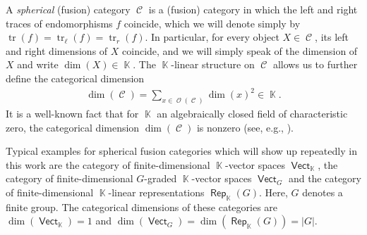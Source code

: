\documentclass[10pt,a4paper]{amsart}
\DeclareMathOperator{\tr}{tr}
\DeclareMathOperator{\vect}{\mathsf{Vect}}
\DeclareMathOperator{\Rep}{\mathsf{Rep}}
\DeclareMathOperator{\K}{\mathbb{K}}
\DeclareMathOperator{\calc}{\mathcal{C}}
\DeclareMathOperator{\calo}{\mathcal{O}}
\numberwithin{equation}{section}
\theoremstyle{definition}
\begin{document}
A \textit{spherical} (fusion) category $\calc$ is a (fusion) category in which the left and right traces of endomorphisms $f$ coincide, which we will denote simply by $\tr(f) = \tr_{\ell}(f) = \tr_r(f)$. In particular, for every object $X \in \calc$, its left and right dimensions of $X$ coincide, and we will simply speak of the dimension of $X$ and write $\dim(X) \in \K$.
The $\K$-linear structure on $\calc$ allows us to further define the categorical dimension
\begin{align*}
 \dim(\calc) = \sum_{x \in \calo(\calc)}\dim(x)^2 \in \K.
\end{align*}
It is a well-known fact that for $\K$ an algebraically closed field of characteristic zero, the categorical dimension $\dim(\calc)$ is nonzero (see, e.g., \cite[Theorem~7.21.12]{EGNO}).

Typical examples for spherical fusion categories which will show up repeatedly in this work are the category of finite-dimensional $\K$-vector spaces $\vect_{\K}$, the category of finite-dimensional $G$-graded $\K$-vector spaces $\vect_G$ and the category of finite-dimensional $\K$-linear representations $\Rep_{\K}(G)$. Here, $G$ denotes a finite group. The categorical dimensions of these categories are $\dim(\vect_{\K}) = 1$ and $\dim(\vect_G) = \dim(\Rep_{\K}(G)) = |G|$.
\end{document}
